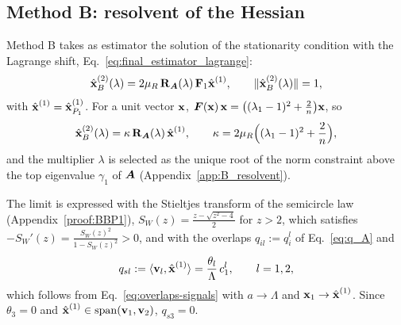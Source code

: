 \subsection{Method B: resolvent of the Hessian}\label{sec:methodB}
Method B takes as estimator the solution of the stationarity condition with the Lagrange shift, Eq.~\eqref{eq:final_estimator_lagrange}:
\begin{equation}
    \hat{\boldsymbol{\mathbf{x}}}^{(2)}_B(\lambda) = 2\mu_R\,\boldsymbol{\mathbf{R}}_{\bm{A}}(\lambda)\,\boldsymbol{\mathbf{F}}_1 \hat{\boldsymbol{\mathbf{x}}}^{(1)},
    \qquad  \|\hat{\boldsymbol{\mathbf{x}}}^{(2)}_B(\lambda) \| = 1 ,
    \label{eq:x_hat_b}
\end{equation}
with $\hat{\boldsymbol{\mathbf{x}}}^{(1)} = \hat{\boldsymbol{\mathbf{x}}}^{(1)}_{P_1}$. For a unit vector $\boldsymbol{\mathbf{x}}$, $\bm{F}(\boldsymbol{\mathbf{x}})\,\boldsymbol{\mathbf{x}} = \big((\lambda_1-1)^2 + \frac2n\big)\boldsymbol{\mathbf{x}}$, so
\begin{equation}
    \hat{\boldsymbol{\mathbf{x}}}^{(2)}_B(\lambda) = \kappa\,\boldsymbol{\mathbf{R}}_{\bm{A}}(\lambda)\,\hat{\boldsymbol{\mathbf{x}}}^{(1)},
    \qquad
    \kappa = 2\mu_R\Big((\lambda_1-1)^2 + \frac2n\Big) ,
    \label{eq:xB_basisA}
\end{equation}
and the multiplier $\lambda$ is selected as the unique root of the norm constraint above the top eigenvalue $\gamma_1$ of $\bm{A}$ (Appendix~\ref{app:B_resolvent}).

\noindent
The limit is expressed with the Stieltjes transform of the semicircle law (Appendix~\ref{proof:BBP1}), $S_W(z) = \frac{z - \sqrt{z^2-4}}{2}$ for $z>2$, which satisfies $-S_W'(z) = \frac{S_W(z)^2}{1-S_W(z)^2} > 0$, and with the overlaps $q_{il} := q_i^l$ of Eq.~\eqref{eq:q_A} and
\begin{equation}
    q_{sl} := \langle \boldsymbol{\mathbf{v}}_l, \hat{\boldsymbol{\mathbf{x}}}^{(1)}\rangle = \frac{\theta_l}{\Lambda}\,c^l_1 , \qquad l = 1,2,
\end{equation}
which follows from Eq.~\eqref{eq:overlaps-signals} with $a\to\Lambda$ and $\boldsymbol{\mathbf{x}}_1\to\hat{\boldsymbol{\mathbf{x}}}^{(1)}$. Since $\theta_3 = 0$ and $\hat{\boldsymbol{\mathbf{x}}}^{(1)} \in \mathrm{span}(\boldsymbol{\mathbf{v}}_1,\boldsymbol{\mathbf{v}}_2)$, $q_{s3} = 0$.

